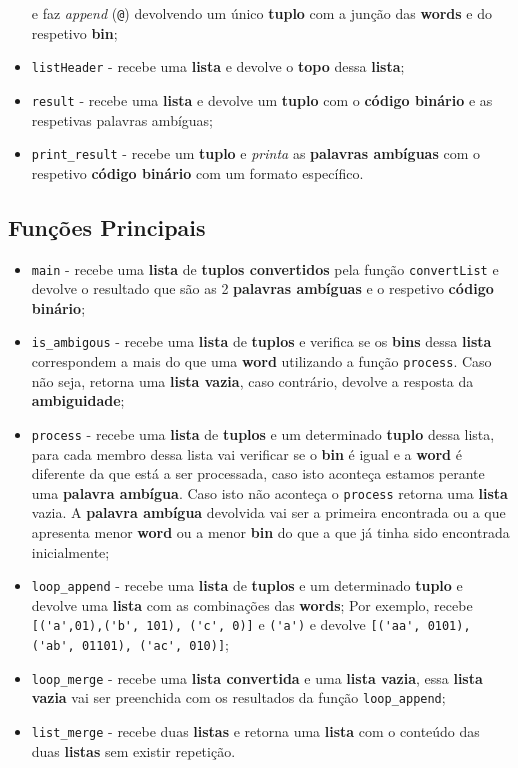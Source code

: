 \documentclass[11pt]{article}   %
\begin{document}
\begin{itemize}
    e faz \textit{append} (\verb|@|) devolvendo um único \textbf{tuplo} com a junção das \textbf{words} e 
    do respetivo \textbf{bin};
    \item \verb|listHeader| - recebe uma \textbf{lista} e devolve o \textbf{topo} dessa \textbf{lista};
    \item \verb|result| - recebe uma \textbf{lista} e devolve um \textbf{tuplo} com o \textbf{código binário}
    e as respetivas palavras ambíguas;
    \item \verb|print_result| - recebe um \textbf{tuplo} e \textit{printa} as \textbf{palavras ambíguas} com
    o respetivo \textbf{código binário} com um formato específico.
\end{itemize}

\subsection{Funções Principais}

\begin{itemize}
    \item \verb|main| - recebe uma \textbf{lista} de \textbf{tuplos convertidos} pela função 
    \verb|convertList| e devolve o resultado que são as 2 \textbf{palavras ambíguas} e o respetivo 
    \textbf{código binário};
    \item \verb|is_ambigous| - recebe uma \textbf{lista} de \textbf{tuplos} e verifica se os 
    \textbf{bins} dessa \textbf{lista} correspondem a mais do que uma \textbf{word} utilizando 
    a função \verb|process|. Caso não seja, retorna uma \textbf{lista vazia}, caso contrário, 
    devolve a resposta da \textbf{ambiguidade};
    \item \verb|process| - recebe uma \textbf{lista} de \textbf{tuplos} e um determinado 
    \textbf{tuplo} dessa lista, para cada membro dessa lista vai verificar se o \textbf{bin}
    é igual e a \textbf{word} é diferente da que está a ser processada, caso isto aconteça
    estamos perante uma \textbf{palavra ambígua}. Caso isto não aconteça o \verb|process|
    retorna uma \textbf{lista} vazia.
    A \textbf{palavra ambígua} devolvida vai ser a primeira encontrada ou a que apresenta
    menor \textbf{word} ou a menor \textbf{bin} do que a que já tinha sido encontrada inicialmente;
    \item \verb|loop_append| - recebe uma \textbf{lista} de \textbf{tuplos} e um determinado
    \textbf{tuplo} e devolve uma \textbf{lista} com as combinações das \textbf{words};
    Por exemplo, recebe \verb|[('a',01),('b', 101), ('c', 0)]| e \verb|('a')| e devolve 
    \verb|[('aa', 0101), ('ab', 01101), ('ac', 010)]|;
    \item \verb|loop_merge| - recebe uma \textbf{lista convertida} e uma \textbf{lista vazia}, essa
    \textbf{lista vazia} vai ser preenchida com os resultados da função \verb|loop_append|;
    \item \verb|list_merge| - recebe duas \textbf{listas} e retorna uma \textbf{lista} com o 
    conteúdo das duas \textbf{listas} sem existir repetição.
\end{itemize}
\end{document}
